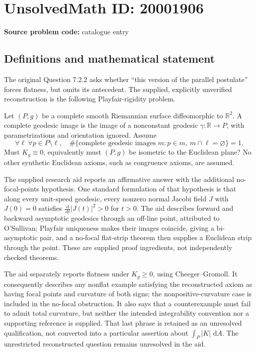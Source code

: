 \documentclass[11pt]{article}
\newcommand{\R}{\mathbb{R}}
\newcommand{\dd}{\,\mathrm{d}}
\begin{document}
\section*{UnsolvedMath ID: 20001906}
\textbf{Source problem code:} catalogue entry
\subsection{Definitions and mathematical statement}
The original Question 7.2.2 asks whether ``this version of the parallel postulate'' forces flatness, but omits its antecedent. The supplied, explicitly unverified reconstruction is the following Playfair-rigidity problem.

Let \((P,g)\) be a complete smooth Riemannian surface diffeomorphic to \(\R^2\). A complete geodesic image is the image of a nonconstant geodesic \(\gamma:\R\to P\), with parametrizations and orientation ignored. Assume
\[
\forall\ell\ \forall p\in P\setminus\ell,\quad
\#\{\text{complete geodesic images }m:p\in m,\ m\cap\ell=\varnothing\}=1.
\]
Must \(K_g\equiv0\), equivalently must \((P,g)\) be isometric to the Euclidean plane? No other synthetic Euclidean axioms, such as congruence axioms, are assumed.

The supplied research aid reports an affirmative answer with the additional no-focal-points hypothesis. One standard formulation of that hypothesis is that along every unit-speed geodesic, every nonzero normal Jacobi field \(J\) with \(J(0)=0\) satisfies \(\frac{\dd}{\dd t}|J(t)|^2>0\) for \(t>0\). The aid describes forward and backward asymptotic geodesics through an off-line point, attributed to O'Sullivan; Playfair uniqueness makes their images coincide, giving a bi-asymptotic pair, and a no-focal flat-strip theorem then supplies a Euclidean strip through the point. These are supplied proof ingredients, not independently checked theorems.

The aid separately reports flatness under \(K_g\geq0\), using Cheeger--Gromoll. It consequently describes any nonflat example satisfying the reconstructed axiom as having focal points and curvature of both signs; the nonpositive-curvature case is included in the no-focal obstruction. It also says that a counterexample must fail to admit total curvature, but neither the intended integrability convention nor a supporting reference is supplied. That last phrase is retained as an unresolved qualification, not converted into a particular assertion about \(\int_P|K|\,\dd A\). The unrestricted reconstructed question remains unresolved in the aid.
\end{document}
